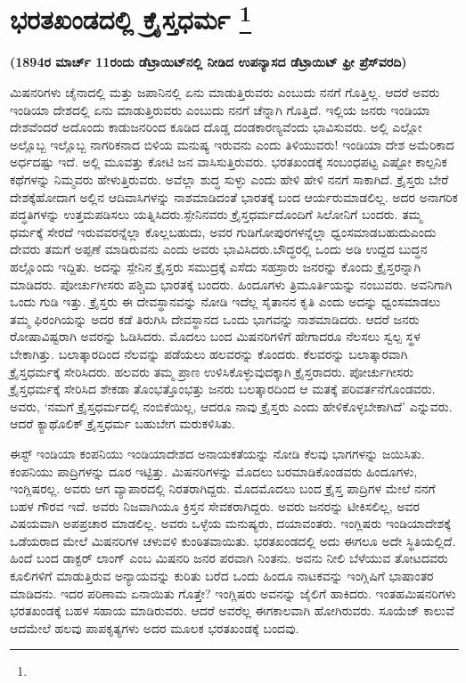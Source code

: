 
\vspace{-0.5cm}

\chapter[ಭರತಖಂಡದಲ್ಲಿ ಕ್ರೈಸ್ತಧರ್ಮ ]{ಭರತಖಂಡದಲ್ಲಿ ಕ್ರೈಸ್ತಧರ್ಮ \protect\footnote{}}

\begin{center}
\textbf{(1894ರ ಮಾರ್ಚ್​ 11ರಂದು ಡೆಟ್ರಾಯಿಟ್​ನಲ್ಲಿ ನೀಡಿದ ಉಪನ್ಯಾಸದ ಡೆಟ್ರಾಯಿಟ್​ ಫ್ರೀ ಪ್ರೆಸ್​ ವರದಿ)}
\end{center}

ಮಿಷನರಿಗಳು ಚೈನಾದಲ್ಲಿ ಮತ್ತು ಜಪಾನಿನಲ್ಲಿ ಏನು ಮಾಡುತ್ತಿರುವರು ಎಂಬುದು ನನಗೆ ಗೊತ್ತಿಲ್ಲ. ಆದರೆ ಅವರು ಇಂಡಿಯಾ ದೇಶದಲ್ಲಿ ಏನು ಮಾಡುತ್ತಿರುವರು ಎಂಬುದು ನನಗೆ ಚೆನ್ನಾಗಿ ಗೊತ್ತಿದೆ. ಇಲ್ಲಿಯ ಜನರು ಇಂಡಿಯಾ ದೇಶವೆಂದರೆ ಅದೊಂದು ಕಾಡುಜನರಿಂದ ಕೂಡಿದ ದೊಡ್ಡ ದಂಡಕಾರಣ್ಯವೆಂದು ಭಾವಿಸುವರು. ಅಲ್ಲಿ ಎಲ್ಲೋ ಅಲ್ಲೊಬ್ಬ ಇಲ್ಲೊಬ್ಬ ನಾಗರಿಕನಾದ ಬಿಳಿಯ ಮನುಷ್ಯ ಇರುವನು ಎಂದು ತಿಳಿಯುವರು! ಇಂಡಿಯಾ ದೇಶ ಅಮೆರಿಕಾದ ಅರ್ಧದಷ್ಟು ಇದೆ. ಅಲ್ಲಿ ಮೂವತ್ತು ಕೋಟಿ ಜನ ವಾಸಿಸುತ್ತಿರುವರು. ಭರತಖಂಡಕ್ಕೆ ಸಂಬಂಧಪಟ್ಟ ಎಷ್ಟೋ ಕಾಲ್ಪನಿಕ ಕಥೆಗಳನ್ನು ನಿಮ್ಮವರು ಹೇಳುತ್ತಿರುವರು. ಅವೆಲ್ಲಾ ಶುದ್ಧ ಸುಳ್ಳು ಎಂದು ಹೇಳಿ ಹೇಳಿ ನನಗೆ ಸಾಕಾಗಿದೆ. ಕ್ರೈಸ್ತರು ಬೇರೆ ದೇಶಕ್ಕೆ\break ಹೋದಾಗ ಅಲ್ಲಿನ ಆದಿವಾಸಿಗಳನ್ನು ನಾಶಮಾಡಿದಂತೆ ಭಾರತಕ್ಕೆ ಬಂದ ಆರ್ಯರು\break ಮಾಡಲಿಲ್ಲ. ಅದರ ಅನಾಗರಿಕ ಪದ್ಧತಿಗಳನ್ನು ಉತ್ತಮಪಡಿಸಲು ಯತ್ನಿಸಿದರು.\break ಸ್ಪೇನಿನವರು ಕ್ರೈಸ್ತಧರ್ಮದೊಂದಿಗೆ ಸಿಲೋನಿಗೆ ಬಂದರು. ತಮ್ಮ ಧರ್ಮಕ್ಕೆ ಸೇರದೆ ಇರುವವರನ್ನೆಲ್ಲಾ ಕೊಲ್ಲಬಹುದು, ಅವರ ಗುಡಿಗೋಪುರಗಳನ್ನೆಲ್ಲಾ ಧ್ವಂಸಮಾಡಬಹುದು\break ಎಂದು ದೇವರು ತಮಗೆ ಅಪ್ಪಣೆ ಮಾಡಿರುವನು ಎಂದು ಅವರು ಭಾವಿಸಿದರು.\break ಬೌದ್ಧರಲ್ಲಿ ಒಂದು ಅಡಿ ಉದ್ದದ ಬುದ್ಧನ ಹಲ್ಲೊಂದು ಇದ್ದಿತು. ಅದನ್ನು ಸ್ಪೇನಿನ ಕ್ರೈಸ್ತರು ಸಮುದ್ರಕ್ಕೆ ಎಸೆದು ಸಹಸ್ರಾರು ಜನರನ್ನು ಕೊಂದು ಕ್ರೈಸ್ತರನ್ನಾಗಿ ಮಾಡಿದರು. ಪೋರ್ಚುಗೀಸರು ಪಶ್ಚಿಮ ಭಾರತಕ್ಕೆ ಬಂದರು. ಹಿಂದೂಗಳು ತ್ರಿಮೂರ್ತಿಯನ್ನು ನಂಬುವರು. ಅವನಿಗಾಗಿ ಒಂದು ಗುಡಿ ಇತ್ತು. ಕ್ರೈಸ್ತರು ಈ ದೇವಸ್ಥಾನವನ್ನು ನೋಡಿ ಇದೆಲ್ಲ ಸೈತಾನನ ಕೃತಿ ಎಂದು ಅದನ್ನು ಧ್ವಂಸಮಾಡಲು ತಮ್ಮ ಫಿರಂಗಿಯನ್ನು ಅದರ ಕಡೆ ತಿರುಗಿಸಿ ದೇವಸ್ಥಾನದ ಒಂದು ಭಾಗವನ್ನು ನಾಶಮಾಡಿದರು. ಆದರೆ ಜನರು ರೋಷಾವಿಷ್ಟರಾಗಿ ಅವರನ್ನು ಓಡಿಸಿದರು. ಮೊದಲು ಬಂದ ಮಿಷನರಿಗಳಿಗೆ ಹೇಗಾದರೂ ನೆಲಸಲು ಸ್ವಲ್ಪ ಸ್ಥಳ ಬೇಕಾಗಿತ್ತು. ಬಲಾತ್ಕಾರದಿಂದ ನೆಲವನ್ನು ಪಡೆಯಲು ಹಲವರನ್ನು ಕೊಂದರು. ಕೆಲವರನ್ನು ಬಲಾತ್ಕಾರವಾಗಿ ಕ್ರೈಸ್ತಧರ್ಮಕ್ಕೆ ಸೇರಿಸಿದರು. ಹಲವರು ತಮ್ಮ ಪ್ರಾಣ ಉಳಿಸಿಕೊಳ್ಳುವುದಕ್ಕಾಗಿ ಕ್ರೈಸ್ತರಾದರು. ಪೋರ್ಚುಗೀಸರು ಕ್ರೈಸ್ತಧರ್ಮಕ್ಕೆ ಸೇರಿಸಿದ ಶೇಕಡಾ ತೊಂಭತ್ತೊಂಭತ್ತು ಜನರು ಬಲತ್ಕಾರದಿಂದ ಆ ಮತಕ್ಕೆ ಪರಿವರ್ತನೆಗೊಂಡವರು. ಅವರು, ‘ನಮಗೆ ಕ್ರೈಸ್ತಧರ್ಮದಲ್ಲಿ ನಂಬಿಕೆಯಿಲ್ಲ, ಆದರೂ ನಾವು ಕ್ರೈಸ್ತರು ಎಂದು ಹೇಳಿಕೊಳ್ಳಬೇಕಾಗಿದೆ’ ಎನ್ನುವರು. ಆದರೆ ಕ್ಯಾಥೊಲಿಕ್​ ಕ್ರೈಸ್ತಧರ್ಮ ಬಹುಬೇಗ ಮರುಕಳಿಸಿತು.

ಈಸ್ಟ್ ಇಂಡಿಯಾ ಕಂಪನಿಯು ಇಂಡಿಯಾದೇಶದ ಅನಾಯಕತೆಯನ್ನು ನೋಡಿ ಕೆಲವು ಭಾಗಗಳನ್ನು ಜಯಿಸಿತು. ಕಂಪನಿಯು ಪಾದ್ರಿಗಳನ್ನು ದೂರ ಇಟ್ಟಿತ್ತು. ಮಿಷನರಿಗಳನ್ನು ಮೊದಲು ಬರಮಾಡಿಕೊಂಡವರು ಹಿಂದೂಗಳು, ಇಂಗ್ಲಿಷರಲ್ಲ. ಅವರು ಆಗ ವ್ಯಾಪಾರದಲ್ಲಿ ನಿರತರಾಗಿದ್ದರು. ಮೊದಮೊದಲು ಬಂದ ಕ್ರೈಸ್ತ ಪಾದ್ರಿಗಳ ಮೇಲೆ ನನಗೆ ಬಹಳ ಗೌರವ ಇದೆ. ಅವರು ನಿಜವಾಗಿಯೂ ಕ್ರಿಸ್ತನ ಸೇವಕರಾಗಿದ್ದರು. ಅವರು ಜನರನ್ನು ಟೀಕಿಸಲಿಲ್ಲ, ಅವರ ವಿಷಯವಾಗಿ ಅಪಪ್ರಚಾರ ಮಾಡಲಿಲ್ಲ. ಅವರು ಒಳ್ಳೆಯ ಮನುಷ್ಯರು, ದಯಾವಂತರು. ಇಂಗ್ಲಿಷರು ಇಂಡಿಯಾದೇಶಕ್ಕೆ ಒಡೆಯರಾದ ಮೇಲೆ ಮಿಷನರಿಗಳ ಚಳುವಳಿ ಕುಂಠಿತವಾಯಿತು. ಭರತಖಂಡದಲ್ಲಿ ಅದು ಈಗಲೂ ಅದೇ ಸ್ಥಿತಿಯಲ್ಲಿದೆ. ಹಿಂದೆ ಬಂದ ಡಾಕ್ಟರ್​ ಲಾಂಗ್​ ಎಂಬ ಮಿಷನರಿ ಜನರ ಪರವಾಗಿ ನಿಂತನು. ಅವನು ನೀಲಿ ಬೆಳೆಯುವ ತೋಟದವರು ಕೂಲಿಗಳಿಗೆ ಮಾಡುತ್ತಿರುವ ಅನ್ಯಾಯವನ್ನು ಕುರಿತು ಬರೆದ ಒಂದು ಹಿಂದೂ ನಾಟಕವನ್ನು ಇಂಗ್ಲಿಷಿಗೆ ಭಾಷಾಂತರ ಮಾಡಿದನು. ಇದರ ಪರಿಣಾಮ ಏನಾಯಿತು ಗೊತ್ತೇ? ಇಂಗ್ಲಿಷರು ಅವನನ್ನು ಜೈಲಿಗೆ ಹಾಕಿದರು. ಇಂತಹ\break ಮಿಷನರಿಗಳು ಭರತಖಂಡಕ್ಕೆ ಬಹಳ ಸಹಾಯ ಮಾಡಿರುವರು. ಆದರೆ ಅವರೆಲ್ಲ ಈಗ\break ಕಾಲವಾಗಿ ಹೋಗಿರುವರು. ಸೂಯೆಜ್​ ಕಾಲುವೆ ಆದಮೇಲೆ ಹಲವು ಪಾಪಕೃತ್ಯಗಳು ಅದರ ಮೂಲಕ ಭರತಖಂಡಕ್ಕೆ ಬಂದವು.

